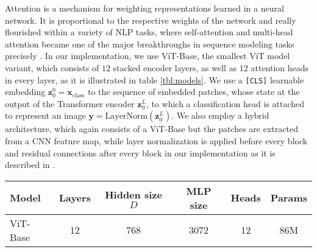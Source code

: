\documentclass{article}
\begin{document}
Attention is a mechanism for weighting representations learned in a neural network. It is proportional to the respective weights of the network and really flourished within a variety of NLP tasks, where self-attention and multi-head attention became one of the major breakthroughs in sequence modeling tasks precisely \cite{guidedtransformer}. In our implementation, we use ViT-Base, the smallest ViT model variant, which consists of $12$ stacked encoder layers, as well as $12$ attention heads in every layer, as it is illustrated in table \ref{tbl:models}. We use a \texttt{[CLS]} learnable embedding $\mathbf{z}_0^0
= \mathbf{x}_{\text{class}}$ to the sequence of embedded patches, whose state at the output of the Transformer encoder $\mathbf{z}_0^L$, to which a classification head is attached to represent an image $\mathbf{y} = \text{LayerNorm}(\mathbf{z}_0^L)$. We also employ a hybrid architecture, which again consists of a ViT-Base but the patches are extracted from a CNN feature map, while layer normalization is applied before
every block and residual connections after every block in our implementation as it is described in \cite{visiontransformer}.

\begin{table*}[]
\centering
\small
\begin{tabular}{l c c c c c}
\toprule
Model            & Layers & Hidden size $D$ & MLP size &  Heads  & Params \\
\midrule 
ViT-Base   &   12   &        768      &   3072   &   12    &   86M  \\
\bottomrule
\end{tabular}
\caption{Details of ViT model variants. Table extracted from \cite{visiontransformer}.}
\label{tbl:models}
\AND\end{table*}
\end{document}
